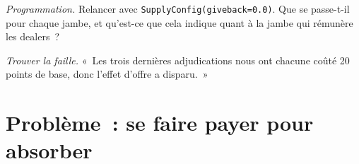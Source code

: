 \begin{exercise}[$\star\star\star$]\label{exo:s2:supply-trades:7}
\emph{Programmation.} Relancer avec \texttt{SupplyConfig(giveback=0.0)}. Que se passe-t-il pour chaque jambe, et qu'est-ce que cela indique quant à la jambe qui
rémunère les dealers~?
\end{exercise}

\begin{exercise}[$\star\star\star$]\label{exo:s2:supply-trades:8}
\emph{Trouver la faille.} «~Les trois dernières adjudications nous ont chacune coûté 20 points de base, donc l'effet d'offre a disparu.~»
\end{exercise}

\section{Problème~: se faire payer pour absorber}

